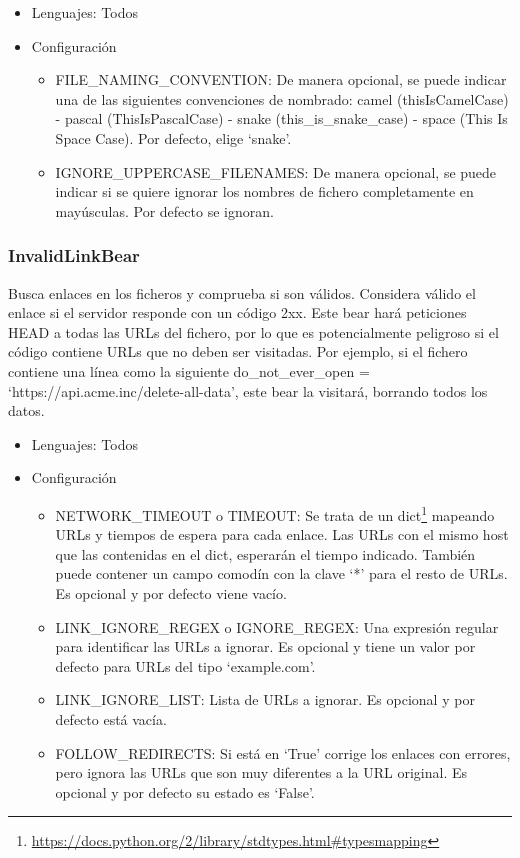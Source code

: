\documentclass[a4paper, 12pt]{book}
\begin{document}
\begin{itemize}
  \item Lenguajes: Todos
  \item Configuración
    \begin{itemize}
          \item FILE\_NAMING\_CONVENTION: De manera opcional, se puede indicar una de las siguientes convenciones de nombrado: camel (thisIsCamelCase) - pascal (ThisIsPascalCase) - snake (this\_is\_snake\_case) - space (This Is Space Case). Por defecto, elige `snake'.
          
          \item IGNORE\_UPPERCASE\_FILENAMES: De manera opcional, se puede indicar si se quiere ignorar los nombres de fichero completamente en mayúsculas. Por defecto se ignoran.
    \end{itemize}
\end{itemize}

\subsubsection{InvalidLinkBear}
\label{sec:seccion1.2.3}
Busca enlaces en los ficheros y comprueba si son válidos. Considera válido el enlace si el servidor responde con un código 2xx. Este bear hará peticiones HEAD a todas las URLs del fichero, por lo que es potencialmente peligroso si el código contiene URLs que no deben ser visitadas. Por ejemplo, si el fichero contiene una línea como la siguiente do\_not\_ever\_open = `https://api.acme.inc/delete-all-data', este bear la visitará, borrando todos los datos.

\begin{itemize}
  \item Lenguajes: Todos
  \item Configuración
    \begin{itemize}
          \item NETWORK\_TIMEOUT o TIMEOUT: Se trata de un dict\footnote{\url{https://docs.python.org/2/library/stdtypes.html#typesmapping}} mapeando URLs y tiempos de espera para cada enlace. Las URLs con el mismo host que las contenidas en el dict, esperarán el tiempo indicado. También puede contener un campo comodín con la clave ‘*’ para el resto de URLs. Es opcional y por defecto viene vacío.
          \item LINK\_IGNORE\_REGEX o IGNORE\_REGEX: Una expresión regular para identificar las URLs a ignorar. Es opcional y tiene un valor por defecto para URLs del tipo `example.com'.
          \item LINK\_IGNORE\_LIST: Lista de URLs a ignorar. Es opcional y por defecto está vacía.
          \item FOLLOW\_REDIRECTS: Si está en ‘True’ corrige los enlaces con errores, pero ignora las URLs que son muy diferentes a la URL original.  Es opcional y por defecto su estado es ‘False’.
    \end{itemize}
\end{itemize}
\end{document}
